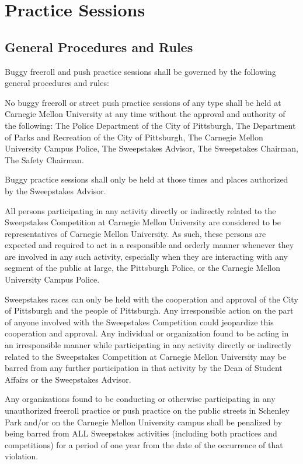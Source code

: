 \chapter{Practice Sessions}

\section{General Procedures and Rules}

	Buggy freeroll and push practice sessions shall be governed by the following
	general procedures and rules:
	\newline

	No buggy freeroll or street push practice sessions of any type shall be held at
	Carnegie Mellon University at any time without the approval and authority
	of the following: The Police Department of the City of Pittsburgh, The
	Department of Parks and Recreation of the City of Pittsburgh, The Carnegie
	Mellon University Campus Police, The Sweepstakes Advisor, The Sweepstakes
	Chairman, The Safety Chairman.

	Buggy practice sessions shall only be held at those times and places authorized
	by the Sweepstakes Advisor.

	All persons participating in any activity directly or indirectly related to the
	Sweepstakes Competition at Carnegie Mellon University are considered to be
	representatives of Carnegie Mellon University. As such, these persons are
	expected and required to act in a responsible and orderly manner whenever they
	are involved in any such activity, especially when they are interacting with
	any segment of the public at large, the Pittsburgh Police, or the Carnegie
	Mellon University Campus Police.

	Sweepstakes races can only be held with the cooperation and approval of the
	City of Pittsburgh and the people of Pittsburgh. Any irresponsible action on
	the part of anyone involved with the Sweepstakes Competition could jeopardize
	this cooperation and approval. Any individual or organization found to be
	acting in an irresponsible manner while participating in any activity directly
	or indirectly related to the Sweepstakes Competition at Carnegie Mellon
	University may be barred from any further participation in that activity by the
	Dean of Student Affairs or the Sweepstakes Advisor.

	Any organizations found to be conducting or otherwise participating in any
	unauthorized freeroll practice or push practice on the public streets in
	Schenley Park and/or on the Carnegie Mellon University campus shall be
	penalized by being barred from ALL Sweepstakes activities (including both
	practices and competitions) for a period of one year from the date of the
	occurrence of that violation.

